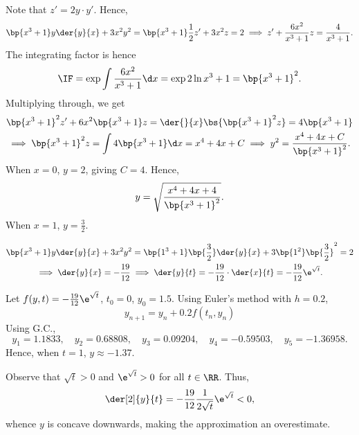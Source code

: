 \begin{solution}
    \begin{ppart}
        Note that $z' = 2y \cdot y'$. Hence, \[\bp{x^3 + 1} y \der{y}{x} + 3 x^2 y^2 = \bp{x^3 + 1} \frac12 z' + 3x^2 z = 2 \implies z' + \frac{6x^2}{x^3 + 1} z = \frac{4}{x^3 + 1}.\] The integrating factor is hence \[\IF = \exp \int \frac{6x^2}{x^3 + 1} \d x = \exp{2\ln{x^3 + 1}} = \bp{x^3 + 1}^2.\] Multiplying through, we get
        \begin{gather*}
            \bp{x^3 + 1}^2 z' +6x^2\bp{x^3 + 1} z = \der{}{x} \bs{\bp{x^3 + 1}^2 z} = 4\bp{x^3 + 1}\\
            \implies \bp{x^3 + 1}^2 z = \int 4\bp{x^3 + 1} \d x = x^4 + 4x + C \implies y^2 = \frac{x^4 + 4x + C}{\bp{x^3 + 1}^2}.
        \end{gather*}
        When $x = 0$, $y = 2$, giving $C = 4$. Hence, \[y = \sqrt{\frac{x^4 + 4x + 4}{\bp{x^3 + 1}^2}}.\] When $x = 1$, $y = \frac32$.
    \end{ppart}
    \begin{ppart}
        \begin{gather*}
            \bp{x^3 + 1} y \der{y}{x} + 3 x^2 y^2 = \bp{1^3 + 1} \bp{\frac32} \der{y}{x} + 3 \bp{1^2} \bp{\frac32}^2 = 2 \\
            \implies \der{y}{x} = -\frac{19}{12} \implies \der{y}{t} = -\frac{19}{12} \cdot \der{x}{t} = -\frac{19}{12} \e^{\sqrt t}.
        \end{gather*}

        Let $f(y, t) = -\frac{19}{12} \e^{\sqrt t}$, $t_0 = 0$, $y_0 = 1.5$. Using Euler's method with $h = 0.2$, \[y_{n+1} = y_n + 0.2 f(t_n, y_n)\] Using G.C., \[y_1 = 1.1833, \quad y_2 = 0.68808, \quad y_3 = 0.09204, \quad y_4 = -0.59503, \quad y_5 = -1.36958.\] Hence, when $t = 1$, $y \approx -1.37$.
    \end{ppart}
    \begin{ppart}
        Observe that $\sqrt t > 0$ and $\e^{\sqrt t} > 0$ for all $t \in \RR$. Thus, \[\der[2]{y}{t} = -\frac{19}{12} \frac{1}{2\sqrt t}\e^{\sqrt t} < 0,\] whence $y$ is concave downwards, making the approximation an overestimate.
    \end{ppart}
\end{solution}

